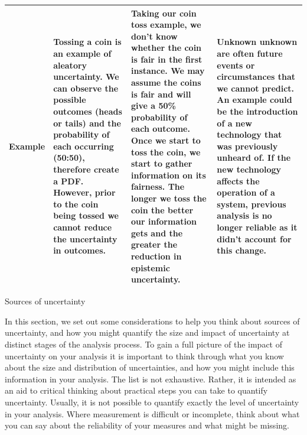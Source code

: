 \documentclass[]{book}
\begin{document}
\begin{longtable}[]{@{}llll@{}}
\begin{minipage}[t]{0.14\columnwidth}\raggedright\strut
 Example \strut
\end{minipage} & \begin{minipage}[t]{0.22\columnwidth}\raggedright\strut
Tossing a coin is an example of aleatory uncertainty. We can observe the
possible outcomes (heads or tails) and the probability of each occurring
(50:50), therefore create a PDF. However, prior to the coin being tossed
we cannot reduce the uncertainty in outcomes.\strut
\end{minipage} & \begin{minipage}[t]{0.25\columnwidth}\raggedright\strut
Taking our coin toss example, we don't know whether the coin is fair in
the first instance. We may assume the coins is fair and will give a 50\%
probability of each outcome. Once we start to toss the coin, we start to
gather information on its fairness. The longer we toss the coin the
better our information gets and the greater the reduction in epistemic
uncertainty.\strut
\end{minipage} & \begin{minipage}[t]{0.28\columnwidth}\raggedright\strut
Unknown unknown are often future events or circumstances that we cannot
predict. An example could be the introduction of a new technology that
was previously unheard of. If the new technology affects the operation
of a system, previous analysis is no longer reliable as it didn't
account for this change.\strut
\end{minipage}\tabularnewline
\bottomrule
\end{longtable}

Sources of uncertainty

 In this section, we set out some considerations to help you think about
sources of uncertainty, and how you might quantify the size and impact
of uncertainty at distinct stages of the analysis process. To gain a
full picture of the impact of uncertainty on your analysis it is
important to think through what you know about the size and distribution
of uncertainties, and how you might include this information in your
analysis. The list is not exhaustive. Rather, it is intended as an aid
to critical thinking about practical steps you can take to quantify
uncertainty. Usually, it is not possible to quantify exactly the level
of uncertainty in your analysis. Where measurement is difficult or
incomplete, think about what you can say about the reliability of your
measures and what might be missing.
\end{document}
